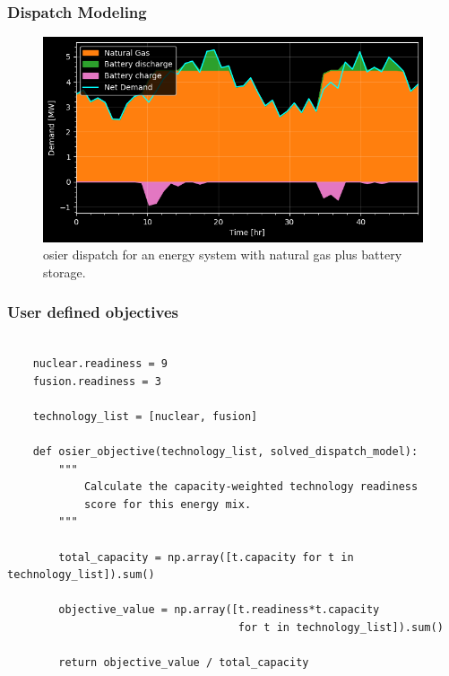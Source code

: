 \begin{frame}
    \frametitle{Dispatch Modeling}
    \begin{figure}
        \centering
        \includegraphics[width=\columnwidth]{images/osier_dispatch_example.png}
        \caption{\gls{osier} dispatch for an energy system with natural gas plus battery storage.}
    \end{figure}
\end{frame}

\begin{frame}[fragile]
    \frametitle{User defined objectives}
    \begin{verbatim} 

    nuclear.readiness = 9
    fusion.readiness = 3

    technology_list = [nuclear, fusion]

    def osier_objective(technology_list, solved_dispatch_model): 
        """ 
            Calculate the capacity-weighted technology readiness 
            score for this energy mix. 
        """

        total_capacity = np.array([t.capacity for t in technology_list]).sum()
        
        objective_value = np.array([t.readiness*t.capacity 
                                    for t in technology_list]).sum()

        return objective_value / total_capacity
    \end{verbatim}
\end{frame}

